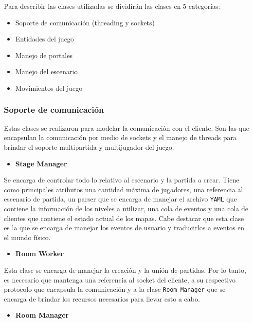 \documentclass[a4paper]{article}
\begin{document}
Para describir las clases utilizadas se dividirán las clases en 5 categorías:
\begin{itemize}
	\item Soporte de comunicación (threading y sockets)
	\item Entidades del juego
	\item Manejo de portales
	\item Manejo del escenario
	\item Movimientos del juego
\end{itemize} 

\subsubsection{Soporte de comunicación}

Estas clases se realizaron para modelar la comunicación con el cliente. Son las que encapsulan la comunicación por medio de sockets y el manejo de threads para brindar el soporte multipartida y multijugador del juego.

\begin{itemize}
	\item \textbf{Stage Manager}
\end{itemize}

Se encarga de controlar todo lo relativo al escenario y la partida a crear. Tiene como principales atributos una cantidad máxima de jugadores, una referencia al escenario de partida, un parser que se encarga de manejar el archivo \texttt{YAML} que contiene la información de los niveles a utilizar, una cola de eventos y una cola de clientes que contiene el estado actual de los mapas.  Cabe destacar que esta clase es la que se encarga de manejar los eventos de usuario y traducirlos a eventos en el mundo físico.

\begin{itemize}
	\item \textbf{Room Worker}
\end{itemize}

Esta clase se encarga de manejar la creación y la unión de partidas. Por lo tanto, es necesario que mantenga una referencia al socket del cliente, a su respectivo protocolo que encapsula la comunicación y a la clase \texttt{Room Manager} que se encarga de brindar los recursos necesarios para llevar esto a cabo.

\begin{itemize}
	\item \textbf{Room Manager}
\end{itemize}
\end{document}
